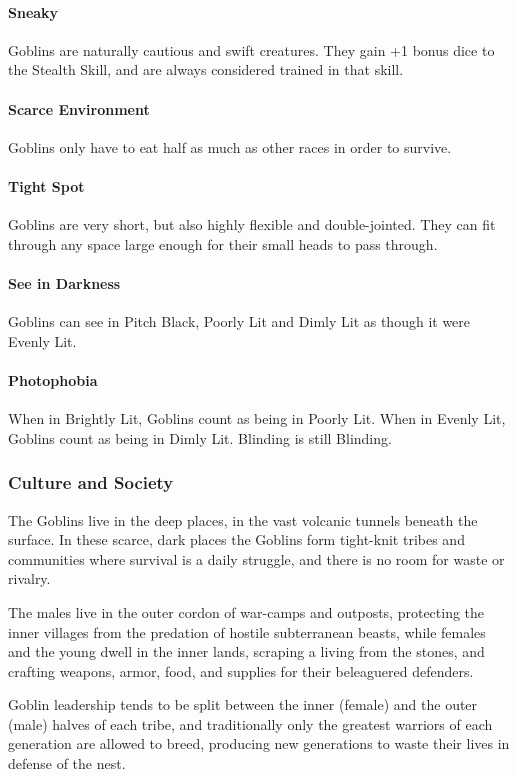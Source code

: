 \documentclass[oneside,11pt,english]{book}
\begin{document}
\paragraph{Sneaky}
Goblins are naturally cautious and swift creatures. They gain +1 bonus dice to
the Stealth Skill, and are always considered trained in that skill.
\paragraph{Scarce Environment}
Goblins only have to eat half as much as other races in order to survive. 
\paragraph{Tight Spot}
Goblins are very short, but also highly flexible and double-jointed. They can
fit through any space large enough for their small heads to pass through.
\paragraph{See in Darkness}
Goblins can see in Pitch Black, Poorly Lit and Dimly Lit as though it were Evenly Lit. 
\paragraph{Photophobia}
When in Brightly Lit, Goblins count as being in Poorly Lit. When in Evenly Lit,
Goblins count as being in Dimly Lit. Blinding is still Blinding.
\subsubsection*{Culture and Society} 
The Goblins live in the deep places, in the vast volcanic tunnels beneath the
surface. In these scarce, dark places the Goblins form tight-knit tribes and
communities where survival is a daily struggle, and there is no room for waste
or rivalry.

The males live in the outer cordon of war-camps and outposts, protecting the
inner villages from the predation of hostile subterranean beasts, while females
and the young dwell in the inner lands, scraping a living from the stones, and
crafting weapons, armor, food, and supplies for their beleaguered defenders.

Goblin leadership tends to be split between the inner (female) and the outer
(male) halves of each tribe, and traditionally only the greatest warriors of
each generation are allowed to breed, producing new generations to waste their
lives in defense of the nest.
\end{document}
